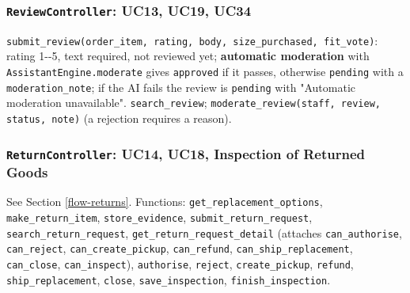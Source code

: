 \hypertarget{reviewcontroller-uc13-uc19-uc34}{%
\subsubsection{\texorpdfstring{\texttt{ReviewController}: UC13, UC19,
UC34}{ReviewController: UC13, UC19, UC34}}\label{reviewcontroller-uc13-uc19-uc34}}

\texttt{submit\_\allowbreak{}review(\allowbreak{}order\_\allowbreak{}item,\allowbreak{} rating,\allowbreak{} body,\allowbreak{} size\_\allowbreak{}purchased,\allowbreak{} fit\_\allowbreak{}vote)}:
rating 1-\/-5, text required, not reviewed yet; \textbf{automatic
moderation} with \texttt{AssistantEngine.\allowbreak{}moderate} gives
\texttt{approved} if it passes, otherwise \texttt{pending} with a
\texttt{moderation\_\allowbreak{}note}; if the AI fails the review is
\texttt{pending} with "Automatic moderation unavailable".
\texttt{search\_\allowbreak{}review};
\texttt{moderate\_\allowbreak{}review(\allowbreak{}staff,\allowbreak{} review,\allowbreak{} status,\allowbreak{} note)} (a rejection
requires a reason).

\hypertarget{returncontroller-uc14-uc18-inspection-of-returned-goods}{%
\subsubsection{\texorpdfstring{\texttt{ReturnController}: UC14, UC18,
Inspection of Returned
Goods}{ReturnController: UC14, UC18, Inspection of Returned Goods}}\label{returncontroller-uc14-uc18-inspection-of-returned-goods}}

See Section \ref{flow-returns}. Functions:
\texttt{get\_\allowbreak{}replacement\_\allowbreak{}options}, \texttt{make\_\allowbreak{}return\_\allowbreak{}item},
\texttt{store\_\allowbreak{}evidence}, \texttt{submit\_\allowbreak{}return\_\allowbreak{}request},
\texttt{search\_\allowbreak{}return\_\allowbreak{}request}, \texttt{get\_\allowbreak{}return\_\allowbreak{}request\_\allowbreak{}detail}
(attaches \texttt{can\_\allowbreak{}authorise}, \texttt{can\_\allowbreak{}reject},
\texttt{can\_\allowbreak{}create\_\allowbreak{}pickup}, \texttt{can\_\allowbreak{}refund},
\texttt{can\_\allowbreak{}ship\_\allowbreak{}replacement}, \texttt{can\_\allowbreak{}close},
\texttt{can\_\allowbreak{}inspect}), \texttt{authorise}, \texttt{reject},
\texttt{create\_\allowbreak{}pickup}, \texttt{refund}, \texttt{ship\_\allowbreak{}replacement},
\texttt{close}, \texttt{save\_\allowbreak{}inspection}, \texttt{finish\_\allowbreak{}inspection}.

